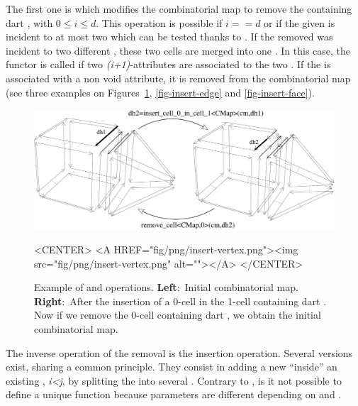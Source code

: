 The first one is  which modifies the
combinatorial map to remove the  containing dart ,
with $0 \leq i \leq d$. This operation is possible if $i==d$ or if the given
 is incident to at most two  which can be tested
thanks to .  If the removed 
was incident to two different , these two cells are
merged into one . In this case, the  functor
is called if two \emph{(i+1)}-attributes are associated to the two
.  If the  is associated with a non void
attribute, it is removed from the combinatorial map  (see three
examples on Figures~\ref{fig-insert-vertex}, \ref{fig-insert-edge} and
\ref{fig-insert-face}).
\begin{figure}[htb]
  \begin{ccTexOnly}
    \begin{center}
      \includegraphics[width=.75\textwidth]{Combinatorial_map/fig/pdf/insert-vertex}
    \end{center}
  \end{ccTexOnly}
  \begin{ccHtmlOnly}
    <CENTER> <A HREF="fig/png/insert-vertex.png"><img
    src="fig/png/insert-vertex.png" alt=""></A> </CENTER>
  \end{ccHtmlOnly}
  \caption{Example of  and
     operations. \textbf{Left}:~Initial
    combinatorial map.  \textbf{Right}:~After the insertion of a
    0-cell in the 1-cell containing dart .  Now if we remove
    the 0-cell containing dart , we obtain the initial
    combinatorial map.}
  \label{fig-insert-vertex}
\end{figure}

The inverse operation of the removal is the insertion operation.
Several versions exist, sharing a common principle. They consist in
adding a new  ``inside'' an existing , \emph{i<j}, by
splitting the  into several .  Contrary to
, is it not possible to define a unique
 function because parameters
are different depending on  and .

